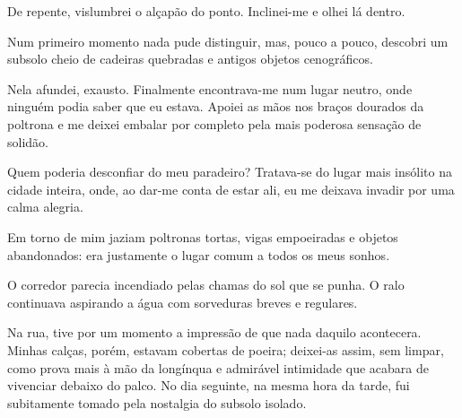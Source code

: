 De repente, vislumbrei o alçapão do ponto. Inclinei-me e olhei lá dentro.

Num primeiro momento nada pude distinguir, mas, pouco a pouco, descobri um
subsolo cheio de cadeiras quebradas e antigos objetos cenográficos.



Nela afundei, exausto. Finalmente encontrava-me num lugar neutro, onde ninguém
podia saber que eu estava. Apoiei as mãos nos braços dourados da poltrona e
me deixei embalar por completo pela mais poderosa sensação de solidão.


Quem poderia desconfiar do meu paradeiro? Tratava-se do lugar mais insólito na
cidade inteira, onde, ao dar-me conta de estar ali, eu me deixava invadir por
uma calma alegria.

Em torno de mim jaziam poltronas tortas, vigas empoeiradas e objetos
abandonados: era justamente o lugar comum a todos os meus sonhos. 



O corredor parecia incendiado pelas chamas do sol que se punha. O ralo
continuava aspirando a água com sorveduras breves e regulares.

Na rua, tive por um momento a impressão de que nada daquilo acontecera. Minhas
calças, porém, estavam cobertas de poeira; deixei-as assim, sem limpar, como
prova mais à mão da longínqua e admirável intimidade que acabara de vivenciar
debaixo do palco. No dia seguinte, na mesma hora da tarde, fui subitamente
tomado pela nostalgia do subsolo isolado.


